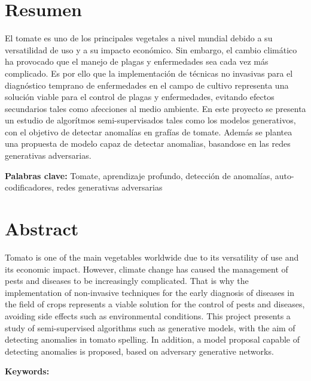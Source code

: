 \chapter*{Resumen}
\thispagestyle{empty}

El tomate es uno de los principales vegetales a nivel mundial debido a su versatilidad de uso y a su impacto económico. Sin embargo, el cambio climático ha provocado que el manejo de plagas y enfermedades sea cada vez más complicado. Es por ello que la implementación de técnicas no invasivas para el diagnóstico temprano de enfermedades en el campo de cultivo representa una solución viable para el control de plagas y enfermedades, evitando efectos secundarios tales como afecciones al medio ambiente. En este proyecto se presenta un estudio de algorítmos semi-supervisados tales como los modelos generativos, con el objetivo de detectar anomalías en grafías de tomate. Además se plantea una propuesta de modelo capaz de detectar anomalias, basandose en las redes generativas adversarias.

\bigskip

\textbf{Palabras clave:} Tomate, aprendizaje profundo, detección de anomalías, auto-codificadores, redes generativas adversarias

\clearpage
\chapter*{Abstract}
\thispagestyle{empty}

Tomato is one of the main vegetables worldwide due to its versatility of use and its economic impact. However, climate change has caused the management of pests and diseases to be increasingly complicated. That is why the implementation of non-invasive techniques for the early diagnosis of diseases in the field of crops represents a viable solution for the control of pests and diseases, avoiding side effects such as environmental conditions. This project presents a study of semi-supervised algorithms such as generative models, with the aim of detecting anomalies in tomato spelling. In addition, a model proposal capable of detecting anomalies is proposed, based on adversary generative networks.

\bigskip

\textbf{Keywords:} \thesisKeywords 

\cleardoublepage

